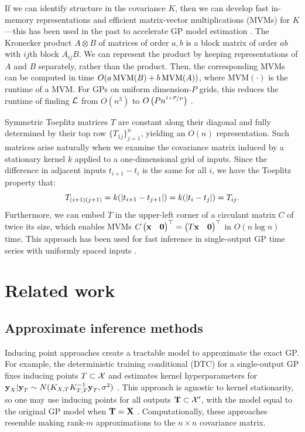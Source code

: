 \documentclass{article}
\begin{document}
If we can identify structure in the covariance $K$, then we can develop fast in-memory representations and efficient matrix-vector multiplications (MVMs) for $K$---this has been used in the past to accelerate GP model estimation \cite{gilboa2015scaling, cunningham2008fast}. The Kronecker product $A\otimes B$ of matrices of order $a,b$ is a block matrix of order $ab$ with $ij$th block $A_{ij}B$. We can represent the product by keeping representations of $A$ and $B$ separately, rather than the product. Then, the corresponding MVMs can be computed in time $O(a\operatorname{MVM}(B)+b\operatorname{MVM}(A))$, where $\text{MVM}(\cdot)$ is the runtime of a MVM. For GPs on uniform dimension-$P$ grids, this reduces the runtime of finding $\mathcal{L}$ from $O(n^3)$ to $O\left({Pn^{\nicefrac{1+P}{P}}}\right)$ \cite{gilboa2015scaling}.

Symmetric Toeplitz matrices $T$ are constant along their diagonal and fully determined by their top row $\{T_{1j}\}_{j=1}^n$, yielding an $O(n)$ representation. Such matrices arise naturally when we examine the covariance matrix induced by a stationary kernel $k$ applied to a one-dimensional grid of inputs. Since the difference in adjacent inputs $t_{i+1}-t_{i}$ is the same for all $i$, we have the Toeplitz property that:
\[
T_{(i+1)(j+1)}=k(\left|t_{i+1} -t_{j+1}\right|)=k(\left|t_i-t_j\right|)=T_{ij}.
\]
Furthermore, we can embed $T$ in the upper-left corner of a circulant matrix $C$ of twice its size, which enables MVMs $C\begin{pmatrix} \textbf{x} & \textbf{0} \end{pmatrix}^\top=\begin{pmatrix} T\textbf{x} &\textbf{0} \end{pmatrix}^\top$ in $O(n\log n)$ time. This approach has been used for fast inference in single-output GP time series with uniformly spaced inputs \cite{cunningham2008fast}.

\section{Related work}
\label{sec:related-work}
\subsection{Approximate inference methods}

Inducing point approaches create a tractable model to approximate the exact GP. For example, the deterministic training conditional (DTC) for a single-output GP fixes inducing points $T\subset\mathcal{X}$ and estimates kernel hyperparameters for $\textbf{y}_{X}|\textbf{y}_{T}\sim N(K_{X,T}K_{T,T}^{-1}\textbf{y}_T,\sigma^2)$ \cite{quinonero2005unifying}. This approach is agnostic to kernel stationarity, so one may use inducing points for all outputs $\textbf{T}\subset \mathcal{X}'$, with the model equal to the original GP model when $\textbf{T}=\textbf{X}$ \cite{alvarez2010efficient}. Computationally, these approaches resemble making rank-$m$ approximations to the $n\times n$ covariance matrix.
\end{document}
